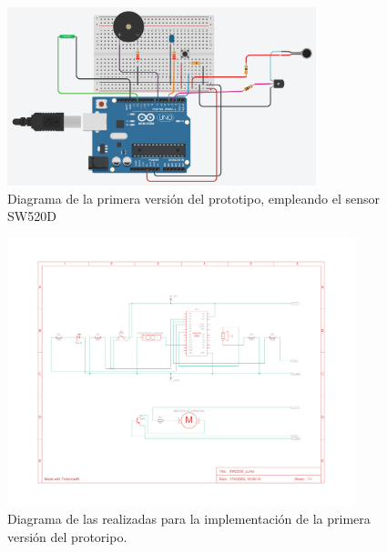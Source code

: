 \begin{figure}[h!]
    \centering
    \includegraphics[width=0.8\textwidth]{img/PrototipoV1_Tilt.png}
    \caption{Diagrama de la primera versión del prototipo, empleando el sensor SW520D}
    \label{fig:ProtV1} %
\end{figure}

\begin{figure}[h]
    \centering
    \includegraphics[width=0.9\textwidth]{img/Prot_V1_Esquema.pdf}
    \caption{Diagrama de las realizadas para la implementación de la primera versión del protoripo.}
    \label{fig:ProtV1_esquema} %
\end{figure}




